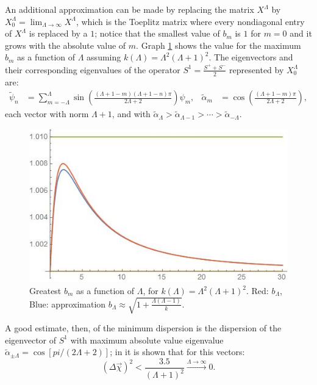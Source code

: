 An additional approximation can be made by replacing the matrix $X^\Lambda$ by $X^\Lambda_0 = \lim_{\Lambda \to \infty} X^\Lambda$, which is the Toeplitz matrix where every nondiagonal entry of $X^\Lambda$ is replaced by a $1$; notice that the smallest value of $b_m$ is $1$ for $m = 0$ and it grows with the absolute value of $m$. Graph \ref{fig:bn} shows the value for the maximum $b_m$ as a function of $\Lambda$ assuming $k(\Lambda) = \Lambda^2(\Lambda+1)^2$. The eigenvectors and their corresponding eigenvalues of the operator $S^1 = \frac{S^+ + S^-}{2}$ represented by $X^\Lambda_0$ are:
\begin{align}
    \tilde \psi_{n} &= \sum_{m = -\Lambda}^\Lambda \sin{\left(\frac{(\Lambda + 1-m)(\Lambda + 1-n)\pi}{2\Lambda + 2}\right)} \psi_m,&
    \tilde \alpha_m &= \cos{\left(\frac{(\Lambda + 1-m)\pi}{2\Lambda + 2}\right)},
\end{align}
each vector with norm $\Lambda + 1$, and with $\tilde \alpha_{\Lambda} > \tilde \alpha_{\Lambda-1} > \cdots > \tilde \alpha_{-\Lambda} $.

\begin{figure}
    \centering
    \includegraphics[width = \textwidth]{images/bn.jpg}
    \caption{Greatest $b_m$ as a function of $\Lambda$, for $k(\Lambda) = \Lambda^2(\Lambda+1)^2$. Red: $b_\Lambda$, Blue: approximation $b_\Lambda \approx \sqrt{1 + \frac{\Lambda(\Lambda - 1)}{k}}$. }
    \label{fig:bn}
\end{figure}

A good estimate, then, of the minimum dispersion is the dispersion of the eigenvector of $S^1$ with maximum absolute value eigenvalue $\tilde \alpha_{\pm \Lambda} = \cos{[pi/(2\Lambda+2)]}$; in \cite{FioreCoherent2020} it is shown that for this vectors:
\begin{equation}
    (\Delta \vec \chi)^2 < \frac{3.5}{(\Lambda+1)^2} \overset{\Lambda \to \infty}{\longrightarrow} 0.
\end{equation}

